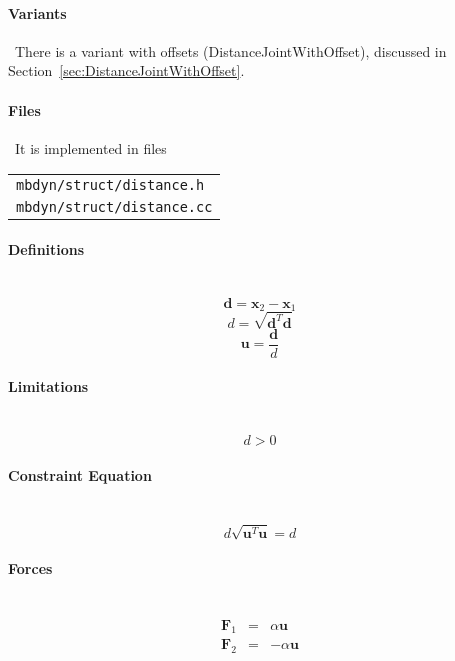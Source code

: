 \documentclass[10pt,dvips,fleqn]{report}
\newcommand{\T}[1]{\boldsymbol{#1}}
\begin{document}
\paragraph{Variants} \
There is a variant with offsets (DistanceJointWithOffset),
discussed in Section~\ref{sec:DistanceJointWithOffset}.

\paragraph{Files} \
It is implemented in files

\begin{tabular}{l}
\texttt{mbdyn/struct/distance.h} \\
\texttt{mbdyn/struct/distance.cc}
\end{tabular}

\paragraph{Definitions} \
\begin{equation}
	\T{d} = \T{x}_2 - \T{x}_1
\end{equation}
\begin{equation}
	d = \sqrt{\T{d}^T \T{d}}
\end{equation}
\begin{equation}
	\T{u} = \frac{\T{d}}{d}
\end{equation}

\paragraph{Limitations} \
\begin{equation}
	d > 0
\end{equation}

\paragraph{Constraint Equation} \
\begin{equation}
	d \sqrt{\T{u}^T \T{u}} = d
\end{equation}

\paragraph{Forces} \
\begin{eqnarray}
	\T{F}_1 & = & \alpha \T{u} \\
	\T{F}_2 & = & -\alpha \T{u}
\end{eqnarray}
\end{document}
